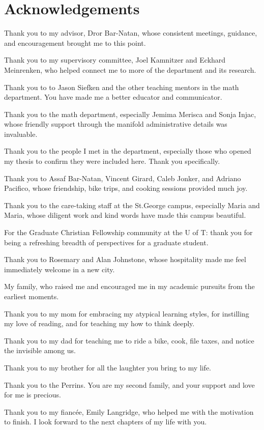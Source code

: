 
\begingroup
\let\clearpage\relax
\let\cleardoublepage\relax

\chapter*{Acknowledgements}

Thank you to my advisor, Dror Bar-Natan, whose consistent meetings, guidance,
and encouragement brought me to this point. 

Thank you to my supervisory committee, Joel Kamnitzer and Eckhard Meinrenken,
who helped connect me to more of the department and its research.

Thank you to to Jason Siefken and the other teaching mentors in the math
department. You have made me a better educator and communicator.

Thank you to the math department, especially Jemima Merisca and Sonja Injac,
whose friendly support through the manifold administrative details was
invaluable.

Thank you to the people I met in the department, especially those who opened
my thesis to confirm they were included here. Thank you specifically.

Thank you to Assaf Bar-Natan, Vincent Girard, Caleb Jonker, and Adriano
Pacifico, whose friendship, bike trips, and cooking sessions provided much joy.

Thank you to the care-taking staff at the St.\@ George campus, especially Maria
and Maria, whose diligent work and kind words have made this campus beautiful.

For the Graduate Christian Fellowship community at the U of T: thank you for
being a refreshing breadth of perspectives for a graduate student.

Thank you to Rosemary and Alan Johnstone, whose hospitality made me feel
immediately welcome in a new city.

My family, who raised me and encouraged me in my academic pursuits from the
earliest moments.

Thank you to my mom for embracing my atypical learning styles, for instilling
my love of reading, and for teaching my how to think deeply.

Thank you to my dad for teaching me to ride a bike, cook, file taxes, and notice
the invisible among us.

Thank you to my brother for all the laughter you bring to my life.

Thank you to the Perrins. You are my second family, and your support and love
for me is precious.

Thank you to my fiancée, Emily Langridge, who helped me with the motivation to
finish. I look forward to the next chapters of my life with you.

\endgroup
